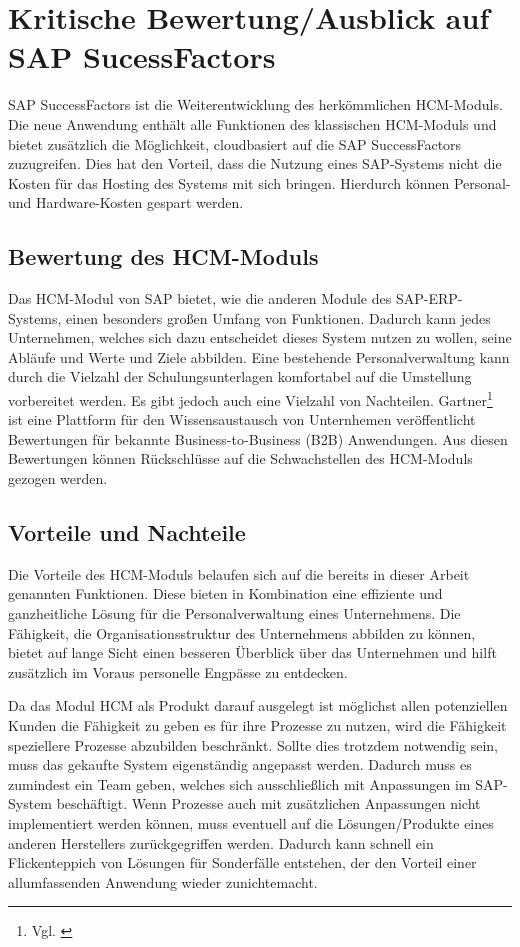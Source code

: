 
\section{Kritische Bewertung/Ausblick auf SAP SucessFactors} 
\label{sec:bewertungundausblick}
SAP SuccessFactors ist die Weiterentwicklung des herkömmlichen HCM-Moduls.
Die neue Anwendung enthält alle Funktionen des klassischen HCM-Moduls und bietet zusätzlich die Möglichkeit, cloudbasiert auf die SAP SuccessFactors zuzugreifen.
Dies hat den Vorteil, dass die Nutzung eines SAP-Systems nicht die Kosten für das Hosting des Systems mit sich bringen.
Hierdurch können Personal- und Hardware-Kosten gespart werden.

\subsection{Bewertung des HCM-Moduls}
Das HCM-Modul von SAP bietet, wie die anderen Module des SAP-ERP-Systems, einen besonders großen Umfang von Funktionen. Dadurch kann jedes Unternehmen, welches sich dazu entscheidet dieses System nutzen zu wollen, seine Abläufe und Werte und Ziele abbilden.
Eine bestehende Personalverwaltung kann durch die Vielzahl der Schulungsunterlagen komfortabel auf die Umstellung vorbereitet werden.
Es gibt jedoch auch eine Vielzahl von Nachteilen. Gartner\footnote{Vgl. \cite{Gartner2024}} ist eine Plattform für den Wissensaustausch von Unternhemen veröffentlicht Bewertungen für bekannte Business-to-Business (B2B) Anwendungen.
Aus diesen Bewertungen können Rückschlüsse auf die Schwachstellen des HCM-Moduls gezogen werden.

\subsection{Vorteile und Nachteile}
Die Vorteile des HCM-Moduls belaufen sich auf die bereits in dieser Arbeit genannten Funktionen.
Diese bieten in Kombination eine effiziente und ganzheitliche Lösung für die Personalverwaltung eines Unternehmens.
Die Fähigkeit, die Organisationsstruktur des Unternehmens abbilden zu können, bietet auf lange Sicht einen besseren Überblick über das Unternehmen und hilft zusätzlich im Voraus personelle Engpässe zu entdecken.

Da das Modul HCM als Produkt darauf ausgelegt ist möglichst allen potenziellen Kunden die Fähigkeit zu geben es für ihre Prozesse zu nutzen, wird die Fähigkeit speziellere Prozesse abzubilden beschränkt.
Sollte dies trotzdem notwendig sein, muss das gekaufte System eigenständig angepasst werden.
Dadurch muss es zumindest ein Team geben, welches sich ausschließlich mit Anpassungen im SAP-System beschäftigt.
Wenn Prozesse auch mit zusätzlichen Anpassungen nicht implementiert werden können, muss eventuell auf die Lösungen/Produkte eines anderen Herstellers zurückgegriffen werden.
Dadurch kann schnell ein Flickenteppich von Lösungen für Sonderfälle entstehen, der den Vorteil einer allumfassenden Anwendung wieder zunichtemacht.

